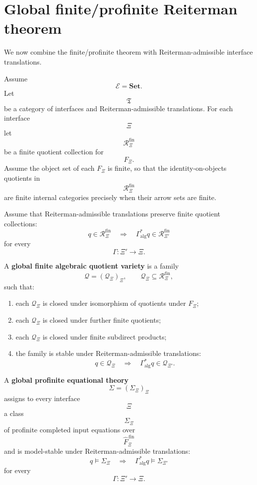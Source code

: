 \section{Global finite/profinite Reiterman theorem}
\label{sec:reiterman-global-finite-profinite}

We now combine the finite/profinite theorem with Reiterman-admissible
interface translations.

Assume
\[
\mathcal E=\mathbf{Set}.
\]
Let
\[
\mathfrak T
\]
be a category of interfaces and Reiterman-admissible translations. For each
interface
\[
\Xi
\]
let
\[
\mathcal R_\Xi^{\mathrm{fin}}
\]
be a finite quotient collection for
\[
F_\Xi.
\]
Assume the object set of each \(F_\Xi\) is finite, so that the
identity-on-objects quotients in
\[
\mathcal R_\Xi^{\mathrm{fin}}
\]
are finite internal categories precisely when their arrow sets are finite.

Assume that Reiterman-admissible translations preserve finite quotient
collections:
\[
q\in\mathcal R_\Xi^{\mathrm{fin}}
\quad\Longrightarrow\quad
\Gamma_{\mathrm{alg}}^\ast q\in\mathcal R_{\Xi'}^{\mathrm{fin}}
\]
for every
\[
\Gamma:\Xi'\to\Xi.
\]

\begin{definition}
\label{def:reiterman-global-finite-quotient-variety}
A \textbf{global finite algebraic quotient variety} is a family
\[
\mathcal Q=(\mathcal Q_\Xi)_\Xi,
\qquad
\mathcal Q_\Xi\subseteq\mathcal R_\Xi^{\mathrm{fin}},
\]
such that:
\begin{enumerate}
\item each \(\mathcal Q_\Xi\) is closed under isomorphism of quotients under
\(F_\Xi\);
\item each \(\mathcal Q_\Xi\) is closed under further finite quotients;
\item each \(\mathcal Q_\Xi\) is closed under finite subdirect products;
\item the family is stable under Reiterman-admissible translations:
\[
q\in\mathcal Q_\Xi
\quad\Longrightarrow\quad
\Gamma_{\mathrm{alg}}^\ast q\in\mathcal Q_{\Xi'}.
\]
\end{enumerate}
\end{definition}

\begin{definition}
\label{def:reiterman-global-profinite-equational-theory}
A \textbf{global profinite equational theory}
\[
\Sigma=(\Sigma_\Xi)_\Xi
\]
assigns to every interface
\[
\Xi
\]
a class
\[
\Sigma_\Xi
\]
of profinite completed input equations over
\[
\widehat F_\Xi^{\,\mathrm{fin}}
\]
and is model-stable under Reiterman-admissible translations:
\[
q\models\Sigma_\Xi
\quad\Longrightarrow\quad
\Gamma_{\mathrm{alg}}^\ast q\models\Sigma_{\Xi'}
\]
for every
\[
\Gamma:\Xi'\to\Xi.
\]
\end{definition}

